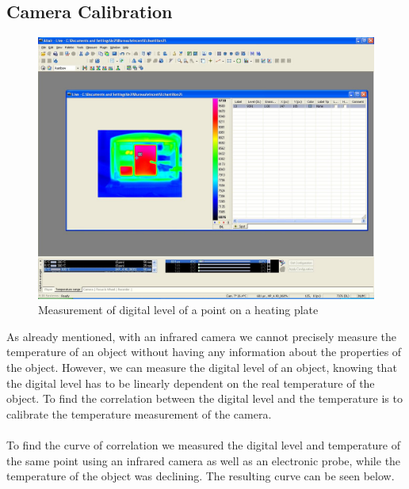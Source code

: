 \documentclass[english]{article}
\begin{document}
\subsection{Camera Calibration}
\begin{figure}[H]
	\centering
	\includegraphics[width=1\linewidth]{Pictures/calib.JPG}
	\caption{Measurement of digital level of a point on a heating plate}
	\label{fig:four}
\end{figure}
As already mentioned, with an infrared camera we cannot precisely measure the temperature of an object without having any information about the properties of the object.
However, we can measure the digital level of an object, knowing that the digital level has to be linearly dependent on the real temperature of the object.
To find the correlation between the digital level and the temperature is to calibrate the temperature measurement of the camera.\\
\\
To find the curve of correlation we measured the digital level and temperature of the same point using an infrared camera as well as an electronic probe, while the temperature of the object was declining.
The resulting curve can be seen below.\\
\end{document}
